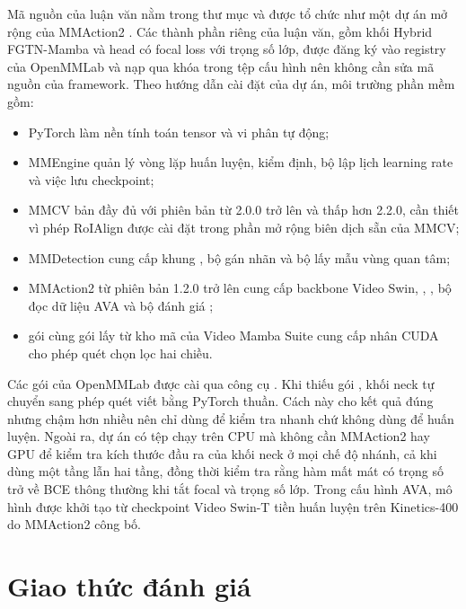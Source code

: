 Mã nguồn của luận văn nằm trong thư mục  và được tổ chức như một dự án mở rộng của MMAction2 \cite{mmaction2}. Các thành phần riêng của luận văn, gồm khối Hybrid FGTN-Mamba và head có focal loss với trọng số lớp, được đăng ký vào registry của OpenMMLab và nạp qua khóa  trong tệp cấu hình nên không cần sửa mã nguồn của framework. Theo hướng dẫn cài đặt của dự án, môi trường phần mềm gồm:
\begin{itemize}
  \item PyTorch \cite{paszke2019pytorch} làm nền tính toán tensor và vi phân tự động;
  \item MMEngine \cite{mmengine} quản lý vòng lặp huấn luyện, kiểm định, bộ lập lịch learning rate và việc lưu checkpoint;
  \item MMCV bản đầy đủ với phiên bản từ 2.0.0 trở lên và thấp hơn 2.2.0, cần thiết vì phép RoIAlign được cài đặt trong phần mở rộng biên dịch sẵn của MMCV;
  \item MMDetection \cite{chen2019mmdetection} cung cấp khung , bộ gán nhãn và bộ lấy mẫu vùng quan tâm;
  \item MMAction2 từ phiên bản 1.2.0 trở lên cung cấp backbone Video Swin, , , bộ đọc dữ liệu AVA và bộ đánh giá ;
  \item gói  cùng gói  lấy từ kho mã của Video Mamba Suite \cite{chen2024videomambasuite} cung cấp nhân CUDA cho phép quét chọn lọc hai chiều.
\end{itemize}
Các gói của OpenMMLab được cài qua công cụ . Khi thiếu gói , khối neck tự chuyển sang phép quét viết bằng PyTorch thuần. Cách này cho kết quả đúng nhưng chậm hơn nhiều nên chỉ dùng để kiểm tra nhanh chứ không dùng để huấn luyện. Ngoài ra, dự án có tệp  chạy trên CPU mà không cần MMAction2 hay GPU để kiểm tra kích thước đầu ra của khối neck ở mọi chế độ nhánh, cả khi dùng một tầng lẫn hai tầng, đồng thời kiểm tra rằng hàm mất mát có trọng số trở về BCE thông thường khi tắt focal và trọng số lớp. Trong cấu hình AVA, mô hình được khởi tạo từ checkpoint Video Swin-T tiền huấn luyện trên Kinetics-400 do MMAction2 công bố.

\section{Giao thức đánh giá}
\label{sec:protocol}

